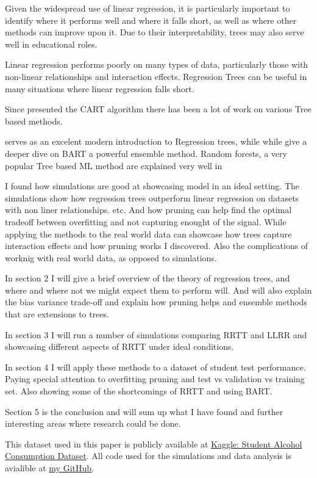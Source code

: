 \documentclass[12pt]{article}
\begin{document}
Given the widespread use of linear regression, it is particularly important to identify where it performs well and where it falls short, as well as where other methods can improve upon it. Due to their interpretability, trees may also serve well in educational roles.

Linear regression performs poorly on many types of data, particularly those with non-linear relationships and interaction effects. Regression Trees can be useful in many situations where linear regression falls short.

Since \citep{breiman1984} presented the CART algorithm there has been a lot of work on various Tree based methods.

\citep{hastie2021} serves as an excelent modern introduction to Regression trees, while while \citep{tan2019} give a deeper dive on BART a powerful ensemble method. 
Random forests, a very popular Tree based ML method are explained very well in\citep{biau2016}



I found how simulations are good at showcasing model in an ideal setting. The simulations show how regression trees outperform linear regression on datasets with non liner relationships. etc. And how pruning can help find the optimal tradeoff between overfitting and not capturing enought of the signal. While applying the methods to the real world data can showcase how trees capture  interaction effects and how pruning works I discovered. Also the complications of worknig with real world data, as opposed to simulations.

  
In section 2 I will give a brief overview of the theory of regression trees, and where and where not we might expect them to perform will. And will also explain the bias variance trade-off and explain how pruning helps and ensemble methods that are extensions to trees.

In section 3 I will run a number of simulations comparing RRTT and LLRR and showcasing different aspects of RRTT under ideal conditions.

In section 4 I will apply these methods to a dataset of student test performance. Paying special attention to overfitting pruning and test vs validation vs training set. Also showing some of the shortcomings of RRTT and using BART.

Section 5 is the conclusion and will sum up what I have found and further interesting areas where research could be done.

This dataset used in this paper is publicly available at \href{https://www.kaggle.com/datasets/uciml/student-alcohol-consumption}{Kaggle: Student Alcohol Consumption Dataset}. All code used for the simulations and data analysis is avialible at \href{https://github.com/Tim2othy/wissenschaftliches-arbeiten}{my GitHub}.
\end{document}
